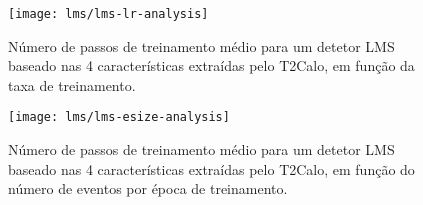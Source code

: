\begin{figure}
\begin{center}
\texttt{[image: lms/lms-lr-analysis]}
\end{center}
\caption{Número de passos de treinamento médio para um detetor LMS baseado nas
4 características extraídas pelo T2Calo, em função da taxa de treinamento.}
\label{fig:lms-lr-analysis}
\end{figure}

\begin{figure}
\begin{center}
\texttt{[image: lms/lms-esize-analysis]}
\end{center}
\caption{Número de passos de treinamento médio para um detetor LMS baseado nas
4 características extraídas pelo T2Calo, em função do número de eventos por
época de treinamento.}
\label{fig:lms-esize-analysis}
\end{figure}

